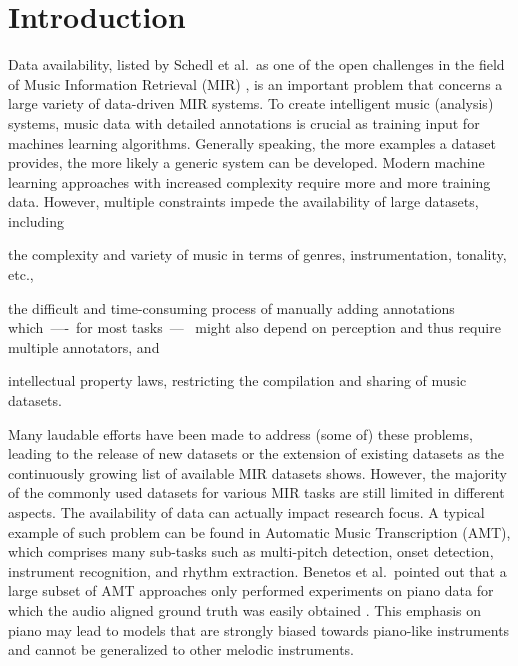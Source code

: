 \documentclass{article}
\begin{document}
\section{Introduction}
Data availability, listed by Schedl et al.\ as one of the open challenges in the field of Music Information Retrieval (MIR) \cite{Schedl2014}, is an important problem that concerns a large variety of data-driven MIR systems. To create intelligent music (analysis) systems, music data with detailed annotations is crucial as training input for machines learning algorithms. Generally speaking, the more examples a dataset provides, the more likely a generic system can be developed. Modern machine learning approaches with increased complexity require more and more training data. However, multiple constraints impede the availability of large datasets, including
\begin{inparaenum}[(i)]
    \item   the complexity and variety of music in terms of genres, instrumentation, tonality, etc., 
    \item   the difficult and time-consuming process of manually adding annotations which~----~for most tasks~---~ might also depend on perception and thus require multiple annotators, and 
    \item   intellectual property laws, restricting the compilation and sharing of music datasets.
\end{inparaenum}
Many laudable efforts have been made to address (some of) these problems, leading to the release of new datasets or the extension of existing datasets as the continuously growing list of available MIR datasets shows. However, the majority of the commonly used datasets for various MIR tasks are still limited in different aspects. The availability of data can actually impact research focus. A typical example of such problem can be found in Automatic Music Transcription (AMT), which comprises many sub-tasks such as multi-pitch detection, onset detection, instrument recognition, and rhythm extraction. Benetos et al.\ pointed out that a large subset of AMT approaches only performed experiments on piano data for which the audio aligned ground truth was easily obtained \cite{Benetos2013}. This emphasis on piano may lead to models that are strongly biased towards piano-like instruments and cannot be generalized to other melodic instruments. 
\end{document}
